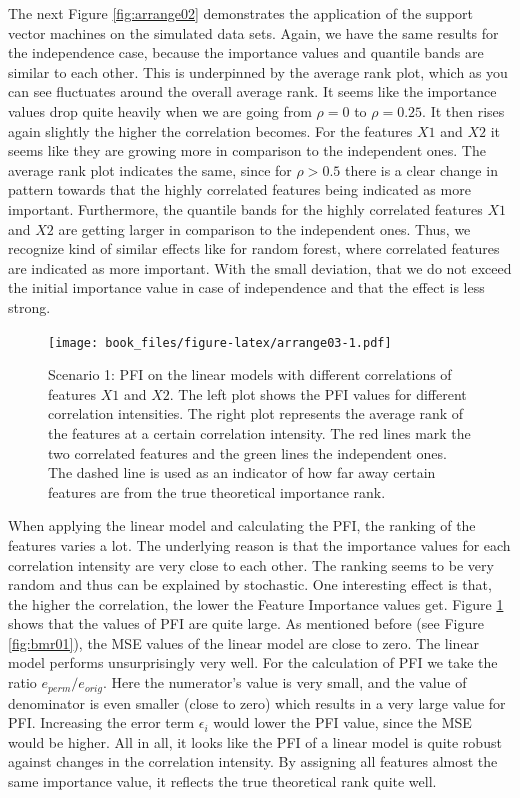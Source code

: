 \documentclass[
]{krantz}
\begin{document}
The next Figure \ref{fig:arrange02} demonstrates the application of the support vector machines on the simulated data sets. Again, we have the same results for the independence case, because the importance values and quantile bands are similar to each other. This is underpinned by the average rank plot, which as you can see fluctuates around the overall average rank. It seems like the importance values drop quite heavily when we are going from \(\rho=0\) to \(\rho=0.25\). It then rises again slightly the higher the correlation becomes. For the features \(X1\) and \(X2\) it seems like they are growing more in comparison to the independent ones. The average rank plot indicates the same, since for \(\rho > 0.5\) there is a clear change in pattern towards that the highly correlated features being indicated as more important. Furthermore, the quantile bands for the highly correlated features \(X1\) and \(X2\) are getting larger in comparison to the independent ones. Thus, we recognize kind of similar effects like for random forest, where correlated features are indicated as more important. With the small deviation, that we do not exceed the initial importance value in case of independence and that the effect is less strong.

\begin{figure}
\centering
\texttt{[image: book\_files/figure-latex/arrange03-1.pdf]}
\caption{\label{fig:arrange03}Scenario 1: PFI on the linear models with different correlations of features \(X1\) and \(X2\). The left plot shows the PFI values for different correlation intensities. The right plot represents the average rank of the features at a certain correlation intensity. The red lines mark the two correlated features and the green lines the independent ones. The dashed line is used as an indicator of how far away certain features are from the true theoretical importance rank.}
\end{figure}

When applying the linear model and calculating the PFI, the ranking of the features varies a lot. The underlying reason is that the importance values for each correlation intensity are very close to each other. The ranking seems to be very random and thus can be explained by stochastic. One interesting effect is that, the higher the correlation, the lower the Feature Importance values get. Figure \ref{fig:arrange03} shows that the values of PFI are quite large. As mentioned before (see Figure \ref{fig:bmr01}), the MSE values of the linear model are close to zero. The linear model performs unsurprisingly very well. For the calculation of PFI we take the ratio \(e_{perm}/e_{orig}\). Here the numerator's value is very small, and the value of denominator is even smaller (close to zero) which results in a very large value for PFI. Increasing the error term \(\epsilon_{i}\) would lower the PFI value, since the MSE would be higher. All in all, it looks like the PFI of a linear model is quite robust against changes in the correlation intensity. By assigning all features almost the same importance value, it reflects the true theoretical rank quite well.
\end{document}
